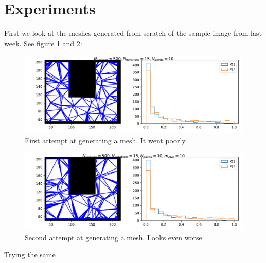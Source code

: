 \documentclass[sigconf]{acmart}
\begin{document}
\section{Experiments}
First we look at the meshes generated from scratch of the sample image from last week. See figure \ref{fig:ex1} and \ref{fig:ex2}:
\begin{figure}
	\includegraphics[width=\linewidth]{ex1.pdf}
	\caption{First attempt at generating a mesh. It went poorly}
	\label{fig:ex1}
\end{figure}

\begin{figure}
	\includegraphics[width=\linewidth]{ex2.pdf}
	\caption{Second attempt at generating a mesh. Looks even worse}
	\label{fig:ex2}
\end{figure}

Trying the same
\end{document}
